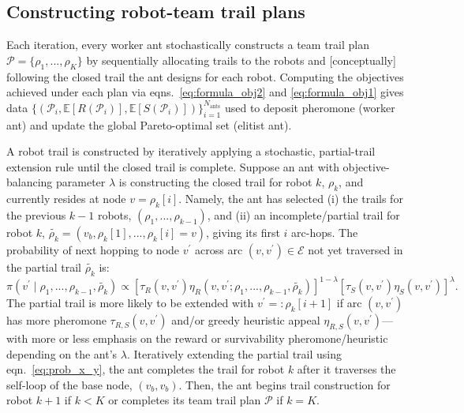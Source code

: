 \documentclass[fleqn,10pt,lineno]{wlpeerj}
\begin{document}
\subsection{Constructing robot-team trail plans}
Each iteration, every worker ant stochastically constructs a team trail plan $\mathcal{P}=\{\rho_1, ..., \rho_K\}$ by sequentially allocating trails to the robots and [conceptually] following the closed trail the ant designs for each robot. Computing the objectives achieved under each plan via eqns.~\ref{eq:formula_obj2} and \ref{eq:formula_obj1} gives data $\{ (\mathcal{P}_i, \mathbb{E}[R(\mathcal{P}_i)], \mathbb{E}[S(\mathcal{P}_i)])\}_{i=1}^{N_{\text{ants}}}$ used to deposit pheromone (worker ant) and update the global Pareto-optimal set (elitist ant). 

A robot trail is constructed by iteratively applying a stochastic, partial-trail extension rule until the closed trail is complete. Suppose an ant with objective-balancing parameter $\lambda$ is constructing the closed trail for robot $k$, $\rho_k$, and currently resides at node $v=\rho_k[i]$.
Namely, the ant has selected (i) the trails for the previous $k-1$ robots, $(\rho_1, ..., \rho_{k-1})$, and (ii) an incomplete/partial trail for robot $k$, $\tilde{\rho_k}=(v_b, \rho_k[1], ..., \rho_k[i]=v)$, giving its first $i$ arc-hops.
The probability of next hopping to node $v^\prime$ across arc $(v, v^\prime)\in\mathcal{E}$ not yet traversed in the partial trail $\tilde{\rho_k}$ is:
 \begin{equation}
	\pi(v^\prime \mid \rho_1, ..., \rho_{k-1}, \tilde{\rho_k}) \propto 
		 \left[\tau_R(v, v^\prime) \eta_R(v, v^\prime; \rho_1, ..., \rho_{k-1},\tilde{\rho_k}) \right]^{1-\lambda} \left[ \tau_S(v, v^\prime) \eta_S(v, v^\prime) \right]^\lambda.
	 \label{eq:prob_x_y}
\end{equation}
The partial trail is more likely to be extended with $v^\prime=:\rho_k[i+1]$ if arc $(v, v^\prime)$ has more pheromone $\tau_{R, S}(v, v^\prime)$ and/or greedy heuristic appeal $\eta_{R, S}(v, v^\prime)$---with more or less emphasis on the reward or survivability pheromone/heuristic depending on the ant's $\lambda$.
Iteratively extending the partial trail using eqn.~\ref{eq:prob_x_y}, the ant completes the trail for robot $k$ after it traverses the self-loop of the base node, $(v_b, v_b)$. Then, the ant begins trail construction for robot $k+1$ if $k<K$ or completes its team trail plan $\mathcal{P}$ if $k=K$. 
\end{document}

